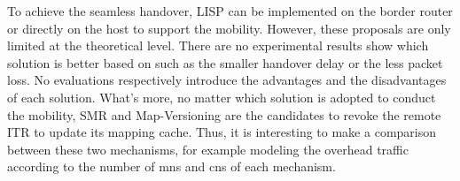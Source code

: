 To achieve the seamless handover, LISP can be implemented on the border router or directly on the host to support the mobility. However, these proposals are only limited at the theoretical level. There are no experimental results show which solution is better based on such as the smaller handover delay or the less packet loss. No evaluations respectively introduce the advantages and the disadvantages of each solution. What's more, no matter which solution is adopted to conduct the mobility, SMR and Map-Versioning are the candidates to revoke the remote ITR to update its mapping cache. Thus, it is interesting to make a comparison between these two mechanisms, for example modeling the overhead traffic according to the number of \acrshort{mn}s and \acrshort{cn}s of each mechanism.
